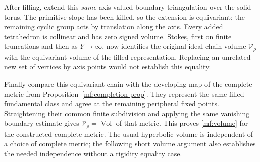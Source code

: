\documentclass[11pt]{article}
\numberwithin{equation}{section}
\theoremstyle{definition}
\theoremstyle{remark}
\newcommand{\Vol}{\operatorname{Vol}}
\begin{document}
After filling, extend this \emph{same} axis-valued boundary
triangulation over the solid torus. The primitive slope has been
killed, so the extension is equivariant; the remaining cyclic group
acts by translation along the axis. Every added tetrahedron is
collinear and has zero signed volume. Stokes, first on finite
truncations and then as \(Y\to\infty\), now identifies the original
ideal-chain volume \(\mathcal V_\rho\) with the equivariant volume
of the filled representation. Replacing an unrelated new set of
vertices by axis points would not establish this equality.

Finally compare this equivariant chain with the developing map of
the complete metric from Proposition~\ref{mf:completion-prop}.
They represent the same filled fundamental class and agree at the
remaining peripheral fixed points. Straightening their common finite subdivision
and applying the same vanishing boundary estimate gives
\(\mathcal V_\rho=\Vol\) of that metric.
This proves \eqref{mf:volume} for the constructed complete metric.
The usual hyperbolic volume is independent of a choice of complete
metric; the following short volume argument also establishes the
needed independence without a rigidity equality case.
\end{document}
